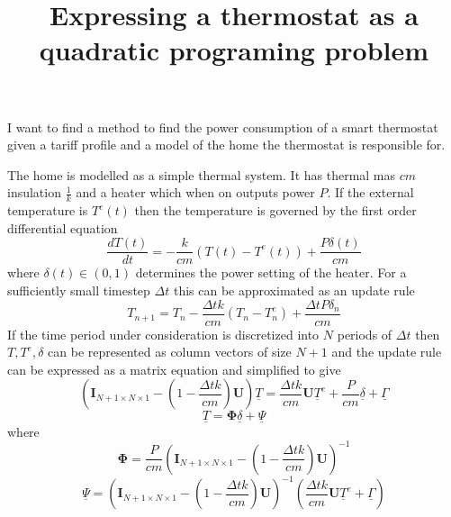\documentclass[11pt]{article}
\title{\textbf{Expressing a thermostat as a quadratic programing problem}}
\author{}
\date{}
\begin{document}
\maketitle

\section{}

I want to find a method to find the power consumption of a smart thermostat given a tariff profile and a model of the home the thermostat is responsible for.

The home is modelled as a simple thermal system. It has thermal mas $cm$ insulation $\frac{1}{k}$ and a heater which when on outputs power $P$. If the external temperature is $T^{e}(t)$ then the temperature is governed by the first order differential equation
\begin{equation}
\frac{dT(t)}{dt} = -\frac{k}{cm}(T(t)-T^{e}(t)) +\frac{P\delta(t)}{cm}
\end{equation}
where $\delta(t) \in (0,1)$ determines the power setting of the heater. For a sufficiently small timestep $\Delta t$  this can be approximated as an update rule
\begin{equation}
T_{n+1} =  T_{n}-\frac{\Delta t k}{cm}(T_{n}-T_{n}^{e}) + \frac{\Delta t P \delta_{n}}{cm} 
\end{equation}
If the time period under consideration is discretized into $N$ periods of $\Delta t$ then $T, T^{e},\delta$ can be represented as column vectors of size $N+1$ and the update rule can be expressed as a matrix equation and simplified to give
\begin{equation}
\left( \mathbf{I}_{N+1 \times N \times 1}-(1-\frac{\Delta t k}{cm})\mathbf{U}\right) \underline{T} = \frac{\Delta t k}{cm}\mathbf{U}\underline{T}^{e}+\frac{P}{cm}\underline{\delta}+\underline{\Gamma}
\end{equation}
\begin{equation}
\underline{T}=\mathbf{\Phi} \underline{\delta}+\underline{\Psi}
\end{equation}
where
\begin{equation}
\mathbf{\Phi}= \frac{P}{cm} \left( \mathbf{I}_{N+1 \times N \times 1}-(1-\frac{\Delta t k}{cm})\mathbf{U}\right)^{-1}
\end{equation}
\begin{equation}
\underline{\Psi}= \left( \mathbf{I}_{N+1 \times N \times 1}-(1-\frac{\Delta t k}{cm})\mathbf{U}\right)^{-1} \left( \frac{\Delta t k}{cm}\mathbf{U}\underline{T}^{e} + \underline{\Gamma}\right)
\end{equation}
\end{document}
